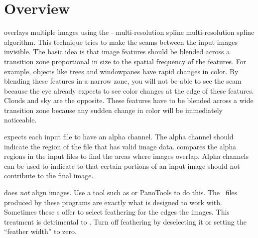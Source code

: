 

\chapter[Overview]{\label{sec:overview}%
  Overview}

%
%
%
%
%
\begin{sloppypar}
  \App{} overlays multiple images using the -
  multi-resolution spline multi-resolution spline algorithm.\footnotemark{} This technique tries
  to make the seams between the input images invisible.  The basic idea is that image features
  should be blended across a transition zone proportional in size to the spatial frequency of
  the features.  For example, objects like trees and windowpanes have rapid changes in color.
  By blending these features in a narrow zone, you will not be able to see the seam because the
  eye already expects to see color changes at the edge of these features.  Clouds and sky are
  the opposite.  These features have to be blended across a wide transition zone because any
  sudden change in color will be immediately noticeable.%
\end{sloppypar}

%
\App{} expects each input file to have an alpha channel.  The alpha channel should indicate the
region of the file that has valid image data.  \App{} compares the alpha regions in the input
files to find the areas where images overlap.  Alpha channels can be used to indicate to \App{}
that certain portions of an input image should not contribute to the final image.

%
%
%
%
%
\App{} does \emph{not} align images.  Use a tool such as  or PanoTools to do
this.  The ~files produced by these programs are exactly what \App{} is designed
to work with.  Sometimes these s offer to select feathering for the edges the
images.  This treatment is detrimental to \App{}.  Turn off feathering by deselecting it or
setting the ``feather width'' to zero.

